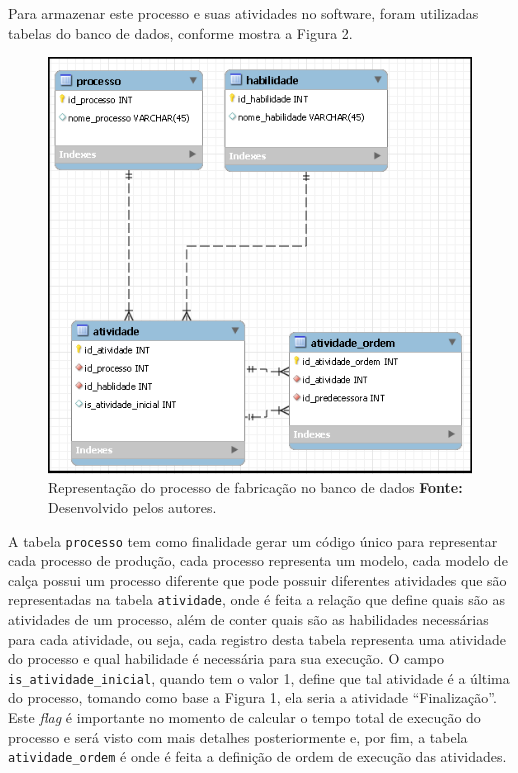 \par Para armazenar este processo e suas atividades no software, foram
utilizadas tabelas do banco de dados, conforme mostra a Figura 2.

\begin{figure}[h!]
	\centerline{\includegraphics[scale=0.7]{./imagens/representacao_processo.png}}
	\caption[Processo de fabricação]
	{Representação do processo de fabricação no banco de dados \textbf{Fonte:}
	Desenvolvido pelos autores.}
	\label{fig:exemplo1}
\end{figure}

\par A tabela \texttt{processo} tem como finalidade gerar um código único para representar 
cada processo de produção, cada processo representa um modelo, cada modelo
de calça possui um processo diferente que pode possuir diferentes atividades que
são representadas na tabela \texttt{atividade}, onde é feita a relação que define quais são as atividades de 
um processo,  além de conter quais são as habilidades necessárias para cada atividade, ou seja, cada registro desta 
tabela representa uma atividade do processo e qual habilidade é necessária para sua execução. O campo 
\texttt{is\_atividade\_inicial}, quando tem o valor 1, define que tal atividade
é a última do processo, tomando como base a Figura 1, ela seria a atividade ``Finalização''. Este
\textit{flag} é importante no momento de calcular o tempo total de execução do
processo e será visto com mais detalhes posteriormente e, por fim, a tabela
\texttt{atividade\_ordem} é onde é feita a definição de ordem de execução das
atividades.

